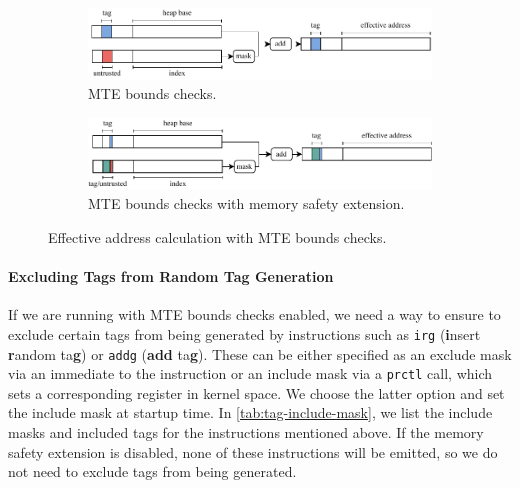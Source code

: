 \begin{figure}[t]
    \centering
    \begin{subfigure}[T]{\textwidth}
        \centering
        \includegraphics{figures/build/bounds}
        \caption{\ac{MTE} bounds checks.}
        \label{fig:mte-bounds-checks}
    \end{subfigure}
    \hfill
    \begin{subfigure}[T]{\textwidth}
        \centering
        \includegraphics{figures/build/bounds-mem-safety}
        \caption{\ac{MTE} bounds checks with memory safety extension.}
        \label{fig:mte-bounds-checks-mem-safety}
    \end{subfigure}
    \caption{Effective address calculation with \ac{MTE} bounds checks.}
    \label{fig:system-design-mem-safety-bounds}
\end{figure}

\paragraph{Excluding Tags from Random Tag Generation}
If we are running with \ac{MTE} bounds checks enabled, we need a way to ensure to exclude certain tags from being generated by instructions such as \texttt{irg} (\textbf{i}nsert \textbf{r}andom ta\textbf{g}) or \texttt{addg} (\textbf{add} ta\textbf{g}).
These can be either specified as an exclude mask via an immediate to the instruction or an include mask via a \texttt{prctl} call, which sets a corresponding register in kernel space.
We choose the latter option and set the include mask at startup time.
In \cref{tab:tag-include-mask}, we list the include masks and included tags for the instructions mentioned above.
If the memory safety extension is disabled, none of these instructions will be emitted, so we do not need to exclude tags from being generated.

